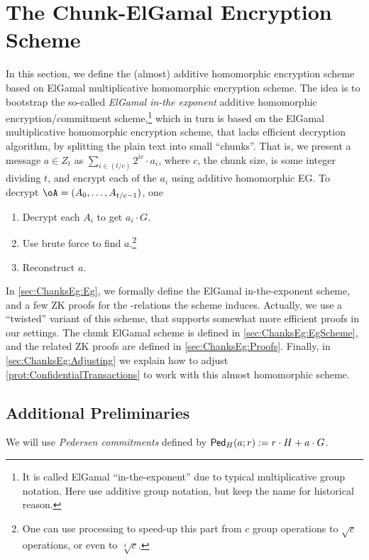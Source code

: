 \section{The Chunk-ElGamal  Encryption Scheme}\label{sec:ChanksEg}
In this section, we define the  (almost) additive homomorphic encryption scheme based on ElGamal multiplicative  homomorphic encryption scheme.  
The idea is to bootstrap the so-called   \textit{ElGamal in-the exponent}   additive homomorphic encryption/commitment  scheme,\footnote{It is called ElGamal ``in-the-exponent'' due to typical multiplicative group notation. Here use additive group notation, but keep the name for historical reason.}  which in turn is based on the  ElGamal multiplicative  homomorphic encryption scheme, that lacks efficient decryption algorithm, by splitting the plain text into small ``chunks''. That  is, we present a message $a\in Z_t$ as $\sum_{i \in (t/c)}   2^{i c} \cdot a_i$, where $c$, the chunk size, is  some integer  dividing $t$, and encrypt each of the $a_i$ using    additive homomorphic EG. To decrypt $\oA= (A_0,\ldots,A_{t/c-1})$, one  
\begin{enumerate}
	\item Decrypt   each $A_i$ to get $a_i  \cdot G$.
	\item Use brute force to find $a$.\footnote{One can use    processing to speed-up this part from $c$ group operations to $\sqrt{c}$  operations, or even  to   $\sqrt[3]{c}$.}
	
	\item Reconstruct $a$.
\end{enumerate}
In \cref{sec:ChanksEg:Eg}, we formally define the  ElGamal in-the-exponent scheme, and a few ZK proofs for the \NP-relations the scheme induces. Actually, we use a ``twisted'' variant of this scheme, that supports somewhat more efficient proofs in our settings.   The chunk ElGamal  scheme is defined in \cref{sec:ChanksEg:EgScheme}, and the related ZK proofs are defined in \cref{sec:ChanksEg:Proofs}. Finally, in \cref{sec:ChanksEg:Adjusting} we explain  how to adjust \cref{prot:ConfidentialTransactions} to work with this almost homomorphic scheme.



\subsection{Additional Preliminaries}\label{sec:ChanksEg:Pre}
We will  use \textit{Pedersen commitments} defined by $\mathsf{Ped}_H(a;r) := r\cdot H + a \cdot G$. 

